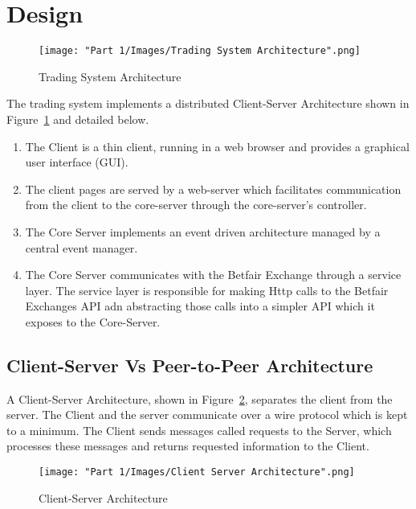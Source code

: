 \section{Design}

		\begin{figure}[H]
			\centering
			\texttt{[image: "Part 1/Images/Trading System Architecture".png]}
			\caption{Trading System Architecture}
    			\label{fig:tradingSystemArchitecture}
		\end{figure}	
		
	The trading system implements a distributed Client-Server Architecture shown in Figure~\ref{fig:tradingSystemArchitecture} and detailed below.
		
		\begin{enumerate}
			\item The Client is a thin client, running in a web browser and provides a graphical user interface (GUI).
			\item The client pages are served by a web-server which facilitates communication from the client to the core-server through the core-server's controller.
			\item The Core Server implements an event driven architecture managed by a central event manager.
			\item The Core Server communicates with the Betfair Exchange through a service layer. The service layer is responsible for making Http calls to the Betfair Exchanges API adn abstracting those calls into a simpler API which it exposes to the Core-Server.
		\end{enumerate}
		
\subsection{Client-Server Vs Peer-to-Peer Architecture}	
	A Client-Server Architecture, shown in Figure~\ref{fig:clientServer}, separates the client from the server. The Client and the server communicate over a wire protocol which is kept to a minimum. The Client sends messages called requests to the Server, which processes these messages and returns requested information to the Client.\\

		\begin{figure}[H]
			\centering
			\texttt{[image: "Part 1/Images/Client Server Architecture".png]}
			\caption{Client-Server Architecture}
    			\label{fig:clientServer}
		\end{figure}	

